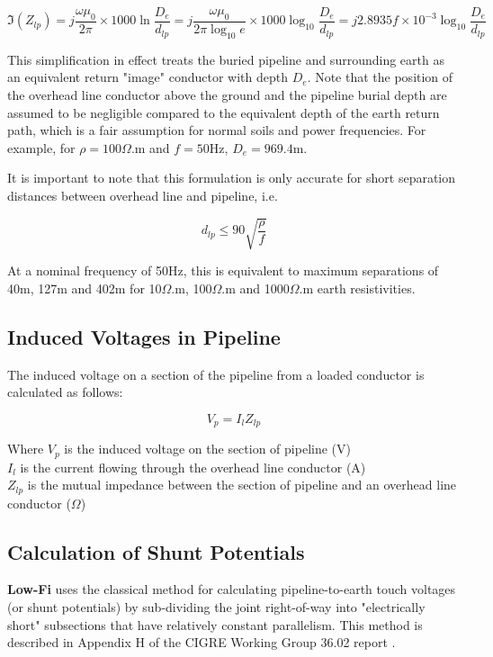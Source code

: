\documentclass{article}
\begin{document}
\begin{equation}
\Im (Z_{lp}) = j \frac{\omega \mu_0}{2 \pi} \times 1000 \ln \frac{D_{e}}{d_{lp}} = j \frac{\omega \mu_0}{2 \pi \log_{10}{e}} \times 1000 \log_{10} \frac{D_{e}}{d_{lp}} = j 2.8935 f \times 10^{-3} \log_{10}{\frac{D_{e}}{d_{lp}}} 
\end{equation}

This simplification in effect treats the buried pipeline and surrounding earth as an equivalent return "image" conductor with depth $D_{e}$. Note that the position of the overhead line conductor above the ground and the pipeline burial depth are assumed to be negligible compared to the equivalent depth of the earth return path, which is a fair assumption for normal soils and power frequencies. For example, for $\rho = 100 \Omega$.m and $f = 50$Hz, $D_e = 969.4$m. 

It is important to note that this formulation is only accurate for short separation distances between overhead line and pipeline, i.e.

\begin{equation}
d_{lp} \leq 90 \sqrt{\frac{\rho}{f}}
\end{equation}

At a nominal frequency of 50Hz, this is equivalent to maximum separations of 40m, 127m and 402m for 10$\Omega$.m, 100$\Omega$.m and 1000$\Omega$.m earth resistivities.

\subsection{Induced Voltages in Pipeline}
The induced voltage on a section of the pipeline from a loaded conductor is calculated as follows:

\begin{equation}
V_{p} = I_{l} Z_{lp}
\end{equation}

Where $V_p$ is the induced voltage on the section of pipeline (V) \\
\hphantom{Where} $I_{l}$ is the current flowing through the overhead line conductor (A) \\
\hphantom{Where} $Z_{lp}$ is the mutual impedance between the section of pipeline and an overhead line conductor ($\Omega$)

\subsection{Calculation of Shunt Potentials}
\textbf{Low-Fi} uses the classical method for calculating pipeline-to-earth touch voltages (or shunt potentials) by sub-dividing the joint right-of-way into "electrically short" subsections that have relatively constant parallelism. This method is described in Appendix H of the CIGRE Working Group 36.02 report \cite{cigre_1995}.
\end{document}
